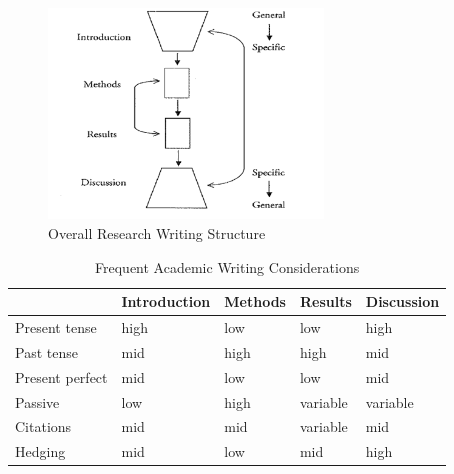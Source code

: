 \begin{figure}[t]
    \centering
   \includegraphics[width=0.65\textwidth]{figures/research/research_writing_formatting.png}
    \caption{Overall Research Writing Structure~\cite{Swales2012}}
    \label{fig:research_writing_formatting}
\end{figure}

\begin{table}[t]
\centering
\caption{Frequent Academic Writing Considerations}
\begin{tabular}{|l|l|l|l|l|}
 \hline
     & \textbf{Introduction} & \textbf{Methods} & \textbf{Results} & \textbf{Discussion} \\
 \hline
    Present tense & high & low & low & high \\
 \hline 
    Past tense & mid & high & high & mid \\
 \hline
    Present perfect & mid & low & low & mid \\
 \hline 
    Passive & low & high & variable & variable \\
 \hline
    Citations & mid & mid & variable & mid \\
 \hline
    Hedging & mid & low & mid & high \\
 \hline
\end{tabular}
\label{table:frequent_writing_considerations}
\end{table}

